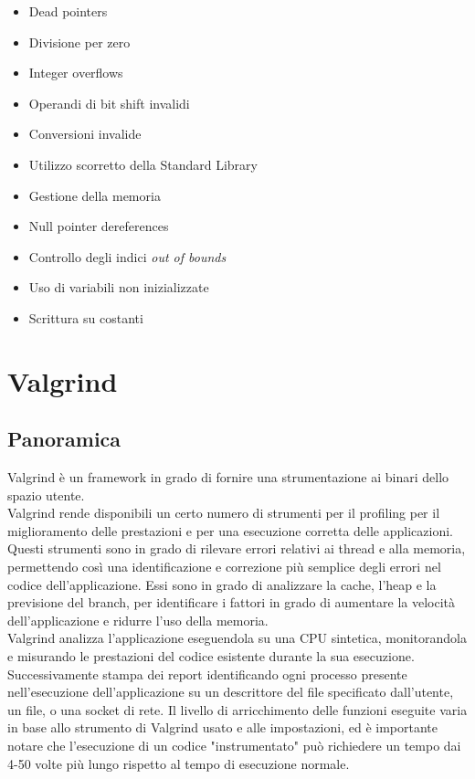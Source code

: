 \documentclass{article}
\begin{document}
\begin{itemize}
    \item Dead pointers
    \item Divisione per zero
    \item Integer overflows
    \item Operandi di bit shift invalidi
    \item Conversioni invalide
    \item Utilizzo scorretto della Standard Library
    \item Gestione della memoria
    \item Null pointer dereferences
    \item Controllo degli indici \emph{out of bounds}
    \item Uso di variabili non inizializzate
    \item Scrittura su costanti
\end{itemize}


\section{Valgrind}

\subsection{Panoramica}
\label{sec:valgrind:panoramica}

Valgrind è un framework in grado di fornire una strumentazione ai binari dello spazio utente. \\

Valgrind rende disponibili un certo numero di strumenti per il profiling per il
miglioramento delle prestazioni e per una esecuzione corretta
delle applicazioni. Questi strumenti sono in grado di rilevare errori relativi
ai thread e alla memoria, permettendo
così una identificazione e correzione più semplice degli errori nel codice
dell'applicazione. Essi sono in grado di analizzare la cache, l'heap e la
previsione del branch, per identificare i fattori in grado di aumentare la
velocità dell'applicazione e ridurre l'uso della memoria. \\

Valgrind analizza l'applicazione eseguendola su una CPU sintetica, monitorandola
e misurando le prestazioni del codice esistente durante la sua esecuzione.
Successivamente stampa dei report identificando ogni processo presente
nell'esecuzione dell'applicazione su un descrittore del file specificato
dall'utente, un file, o una socket di rete. Il livello di arricchimento delle
funzioni eseguite varia in base
allo strumento di Valgrind usato e alle impostazioni, ed è importante notare
che l'esecuzione di un codice "instrumentato" può richiedere un tempo dai 4-50
volte più lungo rispetto al tempo di esecuzione normale. \\
\end{document}
